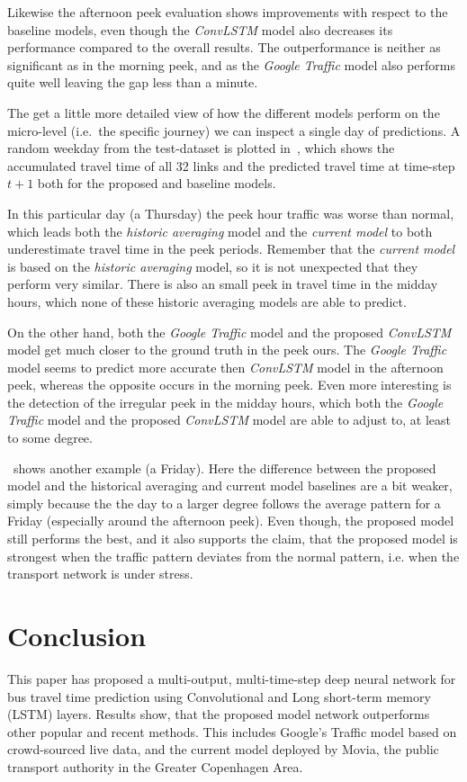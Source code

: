 \documentclass[preprint,11pt,5p,twocolumn]{elsarticle}
\begin{document}
Likewise the afternoon peek evaluation shows improvements with respect to the baseline models, even though the \emph{ConvLSTM} model also decreases its performance compared to the overall results. The outperformance is neither as significant as in the morning peek, and as the \emph{Google Traffic} model also performs quite well leaving the gap less than a minute. 

The get a little more detailed view of how the different models perform on the micro-level (i.e.\ the specific journey) we can inspect a single day of predictions. A random weekday from the test-dataset is plotted in~, which shows the accumulated travel time of all 32 links and the predicted travel time at time-step $t + 1$ both for the proposed and baseline models.

In this particular day (a Thursday) the peek hour traffic was worse than normal, which leads both the \emph{historic averaging} model and the \emph{current model} to both underestimate travel time in the peek periods. Remember that the \emph{current model} is based on the \emph{historic averaging} model, so it is not unexpected that they perform very similar. There is also an small peek in travel time in the midday hours, which none of these historic averaging models are able to predict.

On the other hand, both the \emph{Google Traffic} model and the proposed \emph{ConvLSTM} model get much closer to the ground truth in the peek ours. The \emph{Google Traffic} model seems to predict more accurate then \emph{ConvLSTM} model in the afternoon peek, whereas the opposite occurs in the morning peek. Even more interesting is the detection of the irregular peek in the midday hours, which both the \emph{Google Traffic} model and the proposed \emph{ConvLSTM} model are able to adjust to, at least to some degree.

~shows another example (a Friday). Here the difference between the proposed model and the historical averaging and current model baselines are a bit weaker, simply because the the day to a larger degree follows the average pattern for a Friday (especially around the afternoon peek). Even though, the proposed model still performs the best, and it also supports the claim, that the proposed model is strongest when the traffic pattern deviates from the normal pattern, i.e. when the transport network is under stress.

\section{Conclusion}
\label{sec:conclusion}
This paper has proposed a multi-output, multi-time-step deep neural network for bus travel time prediction using Convolutional and Long short-term memory (LSTM) layers. Results show, that the proposed model network outperforms other popular and recent methods. This includes Google's Traffic model based on crowd-sourced live data, and the current model deployed by Movia, the public transport authority in the Greater Copenhagen Area.
\end{document}
